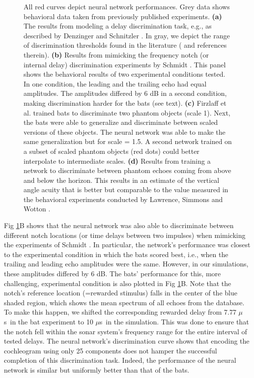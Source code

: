 \documentclass[10pt,letterpaper]{article}
\newcommand{\us}{$\mu$s}
\begin{document}
\begin{figure}[tb]
	\centering
	\caption{All red curves depict neural network performances. Grey data shows behavioral data taken from previously published experiments. \textbf{(a)} The results from modeling a delay discrimination task, e.g., as described by Denzinger and Schnitzler \cite{Denzinger1994}. In gray, we depict the range of discrimination thresholds found in the literature (\cite{Goerlitz2010} and references therein). \textbf{(b)} Results from mimicking the frequency notch (or internal delay) discrimination experiments by Schmidt \cite{Schmidt1992}. This panel shows the behavioral results of two experimental conditions tested. In one condition, the leading and the trailing echo had equal amplitudes. The amplitudes differed by 6 dB in a second condition, making discrimination harder for the bats (see text). \textbf{(c)} Firzlaff et al. \cite{Firzlaff2007} trained bats to discriminate two phantom objects (scale 1). Next, the bats were able to generalize and discriminate between scaled versions of these objects. The neural network was able to make the same generalization but for  scale = 1.5. A second network trained on a subset of scaled phantom objects (red dots) could better interpolate to intermediate scales. \textbf{(d)} Results from training a network to discriminate between phantom echoes coming from above and below the horizon. This results in an estimate of the vertical angle acuity that is better but comparable to the value measured in the behavioral experiments conducted by Lawrence, Simmons and Wotton \cite{Lawrence1982,Wotton2000}.}
	\label{fig:results}
\end{figure}

Fig \ref{fig:results}B shows that the neural network was also able to discriminate between different notch locations (or time delays between two impulses) when mimicking the experiments of Schmidt \cite{Schmidt1992}. In particular, the network's performance was closest to the experimental condition in which the bats scored best, i.e., when the trailing and leading echo amplitudes were the same. However, in our simulations, these amplitudes differed by 6 dB. The bats' performance for this, more challenging, experimental condition is also plotted in Fig \ref{fig:results}B. Note that the notch's reference location (=rewarded stimulus) falls in the center of the blue shaded region, which shows the mean spectrum of all echoes from the database. To make this happen, we shifted the corresponding rewarded delay from 7.77 \us \ in the bat experiment to 10 \us \ in the simulation. This was done to ensure that the notch fell within the sonar system's frequency range for the entire interval of tested delays. The neural network's discrimination curve shows that encoding the cochleogram using only 25 components does not hamper the successful completion of this discrimination task. Indeed, the performance of the neural network is similar but uniformly better than that of the bats. 
\end{document}
